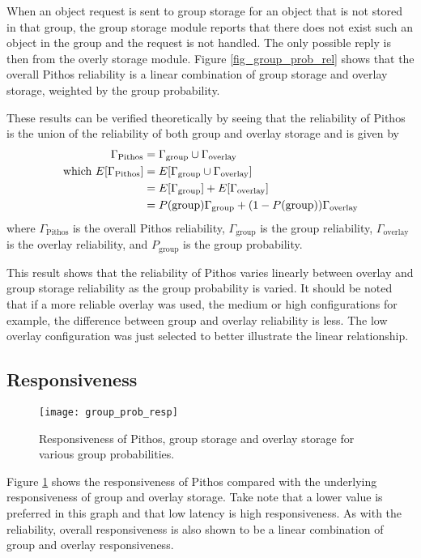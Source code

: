 When an object request is sent to group storage for an object that is not stored in that group, the group storage module reports that there does not exist such an object in the group and the request is not handled. The only possible reply is then from the overly storage module. Figure \ref{fig_group_prob_rel} shows that the overall Pithos reliability is a linear combination of group storage and overlay storage, weighted by the group probability.

These results can be verified theoretically by seeing that the reliability of Pithos is the union of the reliability of both group and overlay storage and is given by
%
\begin{align}
     \Gamma_{\textrm{Pithos}}& = \Gamma_{\textrm{group}} \cup \Gamma_{\textrm{overlay}} \\
     \textrm{which }
  E[\Gamma_{\textrm{Pithos}}]& = E[\Gamma_{\textrm{group}} \cup \Gamma_{\textrm{overlay}}] \notag \\
                             & = E[\Gamma_{\textrm{group}}] + E[\Gamma_{\textrm{overlay}}] \notag \\
                             & = P(\textrm{group})\Gamma_{\textrm{group}} + (1-P(\textrm{group}))\Gamma_{\textrm{overlay}}
\end{align}
%
where $\Gamma_{\textrm{Pithos}}$ is the overall Pithos reliability, $\Gamma_{\textrm{group}}$ is the group reliability, $\Gamma_{\textrm{overlay}}$ is the overlay reliability, and $P_{\textrm{group}}$ is the group probability.

This result shows that the reliability of Pithos varies linearly between overlay and group storage reliability as the group probability is varied. It should be noted that if a more reliable overlay was used, the medium or high configurations for example, the difference between group and overlay reliability is less. The low overlay configuration was just selected to better illustrate the linear relationship.

\subsection{Responsiveness}

\begin{figure}[htbp]
 \centering
 \texttt{[image: group\_prob\_resp]}
 \caption{Responsiveness of Pithos, group storage and overlay storage for various group probabilities.}
 \label{fig_group_prob_resp}
\end{figure}
%
Figure \ref{fig_group_prob_resp} shows the responsiveness of Pithos compared with the underlying responsiveness of group and overlay storage. Take note that a lower value is preferred in this graph and that low latency is high responsiveness. As with the reliability, overall responsiveness is also shown to be a linear combination of group and overlay responsiveness.

